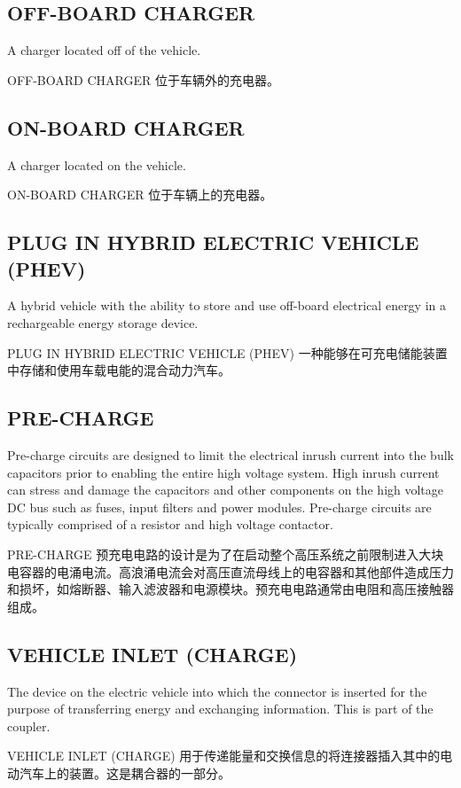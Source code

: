         \subsection*{OFF-BOARD CHARGER}
        \label{def17}
        A charger located off of the vehicle.
        \begin{definition}{OFF-BOARD CHARGER}
        位于车辆外的充电器。
        \end{definition}
        
        \subsection*{ON-BOARD CHARGER}
        \label{def18}
        A charger located on the vehicle.
        \begin{definition}{ON-BOARD CHARGER}
        位于车辆上的充电器。
        \end{definition}
        
        \subsection*{PLUG IN HYBRID ELECTRIC VEHICLE (PHEV)}
        \label{def19}
        A hybrid vehicle with the ability to store and use off-board electrical energy in a rechargeable energy storage device.
        \begin{definition}{PLUG IN HYBRID ELECTRIC VEHICLE (PHEV)}
        一种能够在可充电储能装置中存储和使用车载电能的混合动力汽车。
        \end{definition}
        
        \subsection*{PRE-CHARGE}
        \label{def20}
        Pre-charge circuits are designed to limit the electrical inrush current into the bulk capacitors prior to enabling the entire high voltage system. High inrush current can stress and damage the capacitors and other components on the high voltage DC bus such as fuses, input filters and power modules. Pre-charge circuits are typically comprised of a resistor and high voltage contactor.
        \begin{definition}{PRE-CHARGE}
        预充电电路的设计是为了在启动整个高压系统之前限制进入大块电容器的电涌电流。高浪涌电流会对高压直流母线上的电容器和其他部件造成压力和损坏，如熔断器、输入滤波器和电源模块。预充电电路通常由电阻和高压接触器组成。
        \end{definition}
        
        \subsection*{VEHICLE INLET (CHARGE)}
        \label{def21}
        The device on the electric vehicle into which the connector is inserted for the purpose of transferring energy and exchanging information. This is part of the coupler.
        \begin{definition}{VEHICLE INLET (CHARGE)}
        用于传递能量和交换信息的将连接器插入其中的电动汽车上的装置。这是耦合器的一部分。
        \end{definition}




